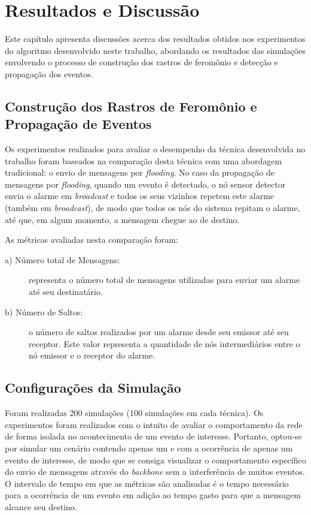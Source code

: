 \newpage\section{Resultados e Discussão}
\label{chap:Resultados}

Este capítulo apresenta discussões acerca dos resultados obtidos nos experimentos do algoritmo desenvolvido neste trabalho, abordando os resultados das simulações envolvendo o processo de construção dos rastros de feromônio e detecção e propagação dos eventos. 

\subsection{Construção dos Rastros de Feromônio e Propagação de Eventos}
Os experimentos realizados para avaliar o desempenho da técnica desenvolvida no trabalho foram baseados na comparação desta técnica com uma abordagem tradicional: o envio de mensagens por \emph{flooding}. No caso da propagação de mensagens por \emph{flooding}, quando um evento é detectado, o nó sensor detector envia o alarme em \emph{broadcast} e todos os seus vizinhos repetem este alarme (também em \emph{broadcast}), de modo que todos os nós do sistema repitam o alarme, até que, em algum momento, a mensagem chegue ao \vant de destino.

As métricas avaliadas nesta comparação foram:

\begin{description}
\item[a) Número total de Mensagens: ] representa o número total de mensagens utilizadas para enviar um alarme até seu destinatário.
\item[b) Número de Saltos:] o número de saltos realizados por um alarme desde seu emissor até seu receptor. Este valor representa a quantidade de nós intermediários entre o nó emissor e o \vant receptor do alarme.
\end{description}

\subsection{Configurações da Simulação}
Foram realizadas 200 simulações (100 simulações em cada técnica). Os experimentos foram realizados com o intuito de avaliar o comportamento da rede de forma isolada no acontecimento de um evento de interesse. Portanto, optou-se por simular um cenário contendo apenas um \vant e com a ocorrência de apenas um evento de interesse, de modo que se consiga visualizar o comportamento específico do envio de mensagens através do \emph{backbone} sem a interferência de muitos eventos. O intervalo de tempo em que as métricas são analisadas é o tempo necessário para a ocorrência de um evento em adição ao tempo gasto para que a mensagem alcance seu destino.

